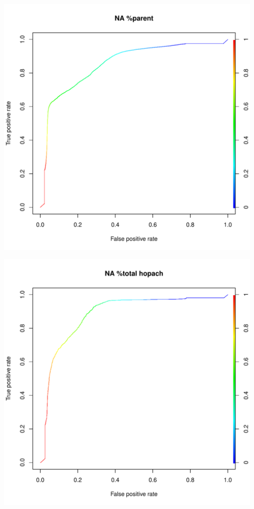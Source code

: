\documentclass[11pt,a4paper,twoside]{report}\usepackage[]{graphicx}\usepackage[]{color}
\makeatletter
\def\maxwidth{ %
  \ifdim\Gin@nat@width>\linewidth
    \linewidth
  \else
    \Gin@nat@width
  \fi
}
\newenvironment{knitrout}{}{} %
\makeatother
\begin{document}
\begin{knitrout}
\includegraphics[width=\maxwidth]{figure/fig_code-27} 

\includegraphics[width=\maxwidth]{figure/fig_code-28} 


\end{knitrout}
\end{document}
